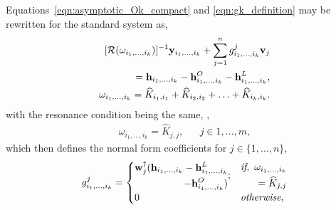 Equations~\eqref{eqn:asymptotic_Ok_compact} and \eqref{eqn:gk_definition} may be rewritten for the standard system as,
\begin{subequations}
	\label{eqn:asymptotic_Ok_compact_std}
	\begin{align}
		\begin{aligned}
			\Resolvent{\omega_{i_{1},\ldots,i_{k}}}^{-1}\AsCenM_{i_{1},\ldots,i_{k}} + \sum^{n}_{j=1}\AsParamEl^{j}_{i_{1},\ldots,i_{k}}\Devec_{j} \\
			= \AsForcing_{i_{1},\ldots,i_{k}} - \AsForcingO_{i_{1},\ldots,i_{k}} 
			- \AsForcingL_{i_{1},\ldots,i_{k}},
		\end{aligned} \\
		\omega_{i_{1},\ldots,i_{k}} = \widehat{K}_{i_{1},i_{1}} + \widehat{K}_{i_{2},i_{2}} + \ldots + \widehat{K}_{i_{k},i_{k}}.
	\end{align}
\end{subequations}
with the resonance condition being the same, \ie,
\begin{align}
	\label{eqn:resonance_condition_Ok_std}
	\omega_{i_{1},\ldots,i_{k}} = \widehat{K}_{j,j}, && j\in 1,\ldots,m,
\end{align}
which then defines the normal form coefficients for $j\in\{1,\ldots,n\}$,
\begin{equation}
	\label{eqn:gk_definition2}
	g^{j}_{i_{1},\ldots,i_{k}} =
	\begin{cases}
		\begin{split}
			\mathbf{w}_{j}^{\dagger}(\mathbf{h}_{i_{1},\ldots,i_{k}} 
			- \mathbf{h}^{L}_{i_{1},\ldots,i_{k}} \\
			- \mathbf{h}^{O}_{i_{1},\ldots,i_{k}})
		\end{split}; & 
		\begin{split}
			\textit{if},\ \omega_{i_{1},\ldots,i_{k}}\\
			= \widehat{K}_{j,j}
		\end{split} \\
		0 & \textit{otherwise},
	\end{cases}
\end{equation}

